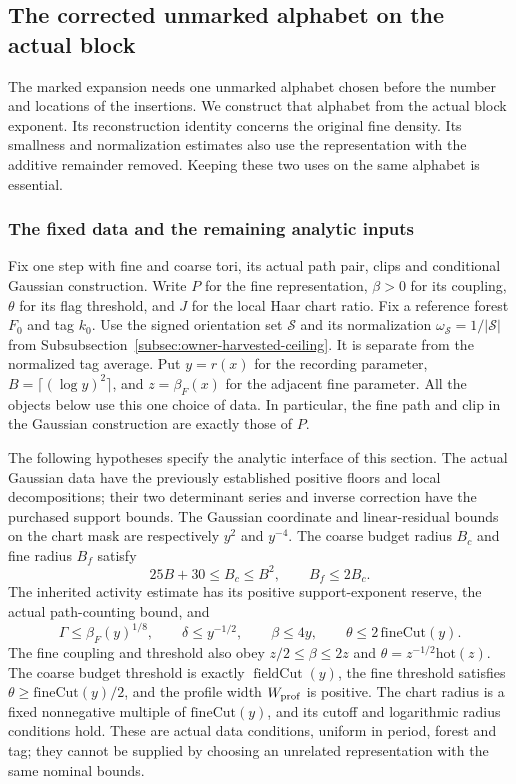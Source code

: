 \subsection{The corrected unmarked alphabet on the actual block}
\label{sec:actual-corrected-body-compiler}

The marked expansion needs one unmarked alphabet chosen before the
number and locations of the insertions. We construct that alphabet
from the actual block exponent. Its reconstruction identity concerns
the original fine density. Its smallness and normalization estimates
also use the representation with the additive remainder removed.
Keeping these two uses on the same alphabet is essential.

\subsubsection{The fixed data and the remaining analytic inputs}

Fix one step with fine and coarse tori, its actual path pair, clips
and conditional Gaussian construction. Write $P$ for the fine
representation, $\beta>0$ for its coupling, $\theta$ for its flag
threshold, and $J$ for the local Haar chart ratio. Fix a reference
forest $F_0$ and tag $k_0$. Use the signed orientation set $\mathcal S$ and its
normalization $\omega_{\mathcal S}=1/|\mathcal S|$ from
Subsubsection~\ref{subsec:owner-harvested-ceiling}. It is separate from the
normalized tag average. Put $y=r(x)$ for the recording
parameter, $B=\lceil(\log y)^2\rceil$, and $z=\beta_F(x)$
for the adjacent fine parameter. All the objects below use this
one choice of data. In particular, the fine path and clip in the
Gaussian construction are exactly those of $P$.

The following hypotheses specify the analytic interface of this
section. The actual Gaussian data have the previously established
positive floors and local decompositions; their two determinant
series and inverse correction have the purchased support bounds.
The Gaussian coordinate and linear-residual bounds on the chart
mask are respectively $y^2$ and $y^{-4}$. The coarse budget
radius $B_c$ and fine radius $B_f$ satisfy
\[
 25B+30\le B_c\le B^2,\qquad B_f\le2B_c.
\]
The inherited activity estimate has its positive support-exponent
reserve, the actual path-counting bound, and
\[
 \Gamma\le\beta_F(y)^{1/8},\qquad
 \delta\le y^{-1/2},\qquad
 \beta\le4y,\qquad \theta\le2\,\mathrm{fineCut}(y).
\]
The fine coupling and threshold also obey
$z/2\le\beta\le2z$ and $\theta=z^{-1/2}\mathrm{hot}(z)$.
The coarse budget threshold is exactly $\operatorname{fieldCut}(y)$,
the fine threshold satisfies $\theta\ge\mathrm{fineCut}(y)/2$,
and the profile width $W_{\rm prof}$ is positive.
The chart radius is a fixed nonnegative multiple of
$\mathrm{fineCut}(y)$, and its cutoff and logarithmic radius
conditions hold. These are actual data conditions, uniform in
period, forest and tag; they cannot be supplied by choosing an
unrelated representation with the same nominal bounds.

